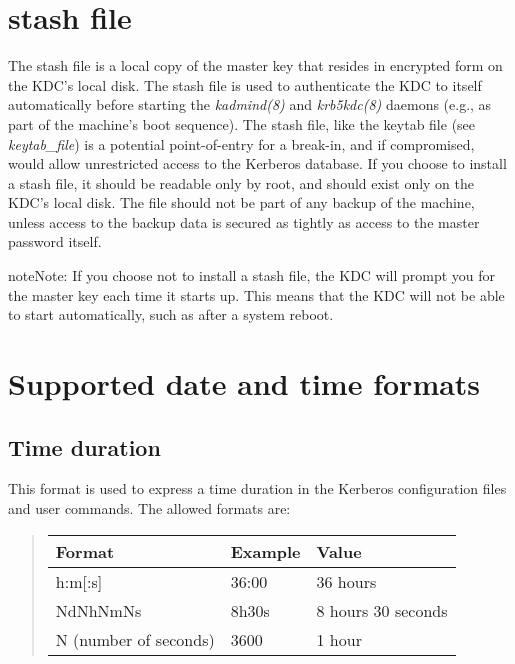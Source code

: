 \documentclass[letterpaper,10pt,english]{sphinxmanual}
\begin{document}
\chapter{stash file}
\label{basic/stash_file_def:stash-file}\label{basic/stash_file_def::doc}\label{basic/stash_file_def:stash-definition}
The stash file is a local copy of the master key that resides in
encrypted form on the KDC's local disk.  The stash file is used to
authenticate the KDC to itself automatically before starting the
\emph{kadmind(8)} and \emph{krb5kdc(8)} daemons (e.g., as part of the
machine's boot sequence).  The stash file, like the keytab file (see
\emph{keytab\_file}) is a potential point-of-entry for a break-in, and
if compromised, would allow unrestricted access to the Kerberos
database.  If you choose to install a stash file, it should be
readable only by root, and should exist only on the KDC's local disk.
The file should not be part of any backup of the machine, unless
access to the backup data is secured as tightly as access to the
master password itself.

\begin{notice}{note}{Note:}
If you choose not to install a stash file, the KDC will prompt you for the master key each time it starts up.
This means that the KDC will not be able to start automatically, such as after a system reboot.
\end{notice}


\chapter{Supported date and time formats}
\label{basic/date_format:supported-date-and-time-formats}\label{basic/date_format::doc}\label{basic/date_format:datetime}

\section{Time duration}
\label{basic/date_format:duration}\label{basic/date_format:time-duration}
This format is used to express a time duration in the Kerberos
configuration files and user commands.  The allowed formats are:
\begin{quote}

\begin{tabulary}{\linewidth}{|L|L|L|}
\hline

Format
 & 
Example
 & 
Value
\\\hline

h:m{[}:s{]}
 & 
36:00
 & 
36 hours
\\\hline

NdNhNmNs
 & 
8h30s
 & 
8 hours 30 seconds
\\\hline

N (number of seconds)
 & 
3600
 & 
1 hour
\\\hline
\end{tabulary}

\end{quote}
\end{document}
